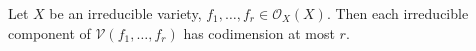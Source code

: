 Let $X$ be an irreducible variety, $f_1, \ldots, f_r \in \mathcal{O}_X(X)$. Then each irreducible component of $\mathcal{V}(f_1, \ldots, f_r)$ has codimension at most $r$.
